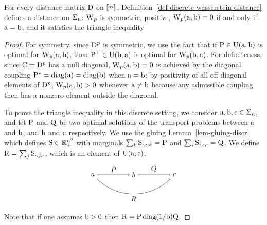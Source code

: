 \begin{prop}\label{prop-metric-histo}
	For every distance matrix $\distD$ on $\range{n}$, Definition~\ref{def-discrete-wasserstein-distance} defines a distance on $\simplex_n$: $\WassD_p$ is symmetric, positive, $\WassD_p(\a,\b)=0$ if and only if $\a = \b$, and it satisfies the triangle inequality
\end{prop}

\begin{proof}
For symmetry, since $\distD^p$ is symmetric, we use the fact that if $\P \in \CouplingsD(\a,\b)$ is optimal for $\WassD_p(\a,\b)$, then $\P^\top \in \CouplingsD(\b,\a)$ is optimal for $\WassD_p(\b,\a)$. For definiteness, since $\C = \distD^p$ has a null diagonal, $\WassD_p(\a,\b)=0$ is achieved by the diagonal coupling $\P^\star=\diag(\a)=\diag(\b)$ when $\a=\b$; by positivity of all off-diagonal elements of $\distD^p$, $\WassD_p(\a,\b)>0$ whenever $\a\ne \b$ because any admissible coupling then has a nonzero element outside the diagonal.

To prove the triangle inequality in this discrete setting, we consider $\a,\b,\VectMode{c} \in\simplex_n$, and let $\P$ and $\Q$ be two optimal solutions of the transport problems between $\a$ and $\b$, and $\b$ and $\VectMode{c}$ respectively.
%
We use the gluing Lemma~\ref{lem-gluing-discr} which defines $\S \in \RR_+^{n^3}$ with marginals $\sum_{k}\S_{\cdot,\cdot,k}=\P$ and $\sum_i \S_{i,\cdot,\cdot}=\Q$. We define $\R=\sum_{j}\S_{\cdot,j,\cdot}$, which is an element of $\CouplingsD(\a,\VectMode{c})$.
\[
\begin{tikzpicture}
  \node (a) at (0,0) {$a$};
  \node (b) at (2,0) {$b$};
  \node (c) at (4,0) {$c$};

  \draw[->] (a) -- (b) node[midway, above] {$P$};
  \draw[->] (b) -- (c) node[midway, above] {$Q$};
  \draw[->, bend right=45] (a) to node[midway, below] {$R$} (c);
\end{tikzpicture}
\]
Note that if one assumes $\b>0$ then $\R = \P \diag(1/\b) \Q$.
%


\end{proof}
